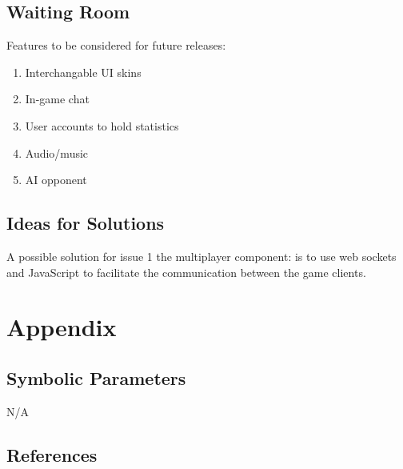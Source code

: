 \documentclass[12pt, titlepage]{article}
\begin{document}
\subsection{Waiting Room}
Features to be considered for future releases:
\begin{enumerate}
    \item Interchangable UI skins
    \item In-game chat
    \item User accounts to hold statistics
    \item Audio/music
    \item AI opponent
\end{enumerate}

\subsection{Ideas for Solutions}
A possible solution for issue 1 the multiplayer component: is to use web sockets and JavaScript to facilitate the communication between the game clients.
\newpage
\section{Appendix}
\subsection{Symbolic Parameters}
N/A
\subsection{References}

\end{document}
